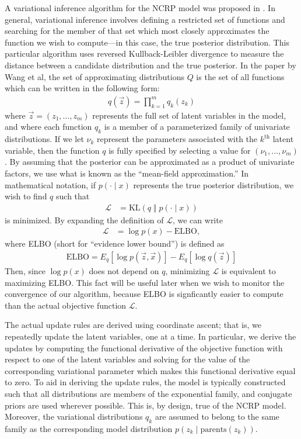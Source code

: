 \documentclass{article}
\newcommand{\nth}{^{\text{th}}}
\begin{document}
A variational inference algorithm for the NCRP model was proposed in \cite{wang2009vi_ncrp}.
In general, variational inference involves defining a restricted set of functions and searching for the member of that set which most closely approximates the function we wish to compute---in this case, the true posterior distribution.
This particular algorithm uses reversed Kullback-Leibler divergence to measure the distance between a candidate distribution and the true posterior.
In the paper by Wang et al, the set of approximating distributions $Q$ is the set of all functions which can be written in the following form:
\begin{align*}
q(\vec z) = \prod_{k=1}^m q_k(z_k)
\end{align*}
where $\vec z = (z_1, \ldots, z_m)$ represents the full set of latent variables in the model, and where each function $q_k$ is a member of a parameterized family of univariate distributions.
If we let $\nu_k$ represent the parameters associated with the $k\nth$ latent variable, then the function $q$ is fully specified by selecting a value for $(\nu_1, \ldots, \nu_m)$.
By assuming that the posterior can be approximated as a product of univariate factors, we use what is known as the ``mean-field approximation.''
In mathematical notation, if $p(\cdot \mid x)$ represents the true posterior distribution, we wish to find $q$ such that
\begin{align*}
\mathcal L &= \text{KL}( q \;\Vert\; p(\cdot \mid x) )
\end{align*}
is minimized.
By expanding the definition of $\mathcal L$, we can write
\begin{align*}
\mathcal L &= \log p(x) - \text{ELBO},
\end{align*}
where ELBO (short for ``evidence lower bound'') is defined as
\begin{align*}
\text{ELBO} = E_q[\log p(\vec z, \vec x)] - E_q[\log q(\vec z)]
\end{align*}
Then, since $\log p(x)$ does not depend on $q$, minimizing $\mathcal L$ is equivalent to maximizing ELBO.
This fact will be useful later when we wish to monitor the convergence of our algorithm, because ELBO is signficantly easier to compute than the actual objective function $\mathcal L$.

The actual update rules are derived using coordinate ascent; that is, we repeatedly update the latent variables, one at a time.
In particular, we derive the updates by computing the functional derivative of the objective function with respect to one of the latent variables and solving for the value of the corresponding variational parameter which makes this functional derivative equal to zero.
To aid in deriving the update rules, the model is typically constructed such that all distributions are members of the exponential family, and conjugate priors are used wherever possible.
This is, by design, true of the NCRP model.
Moreover, the variational distributions $q_k$ are assumed to belong to the same family as the corresponding model distribution $p(z_k \mid \text{parents}(z_k))$.
\end{document}
